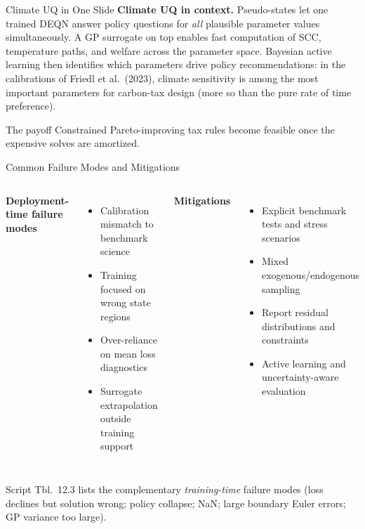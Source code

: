 \documentclass[aspectratio=169,11pt]{beamer}
\begin{document}
\begin{frame}{Climate UQ in One Slide}
\textbf{Climate UQ in context.}  Pseudo-states let one trained DEQN answer policy questions for \emph{all} plausible parameter values simultaneously.  A GP surrogate on top enables fast computation of SCC, temperature paths, and welfare across the parameter space.  Bayesian active learning then identifies which parameters drive policy recommendations: in the calibrations of Friedl et al.\ (2023), climate sensitivity is among the most important parameters for carbon-tax design (more so than the pure rate of time preference).

\vspace{0.25cm}
\begin{exampleblock}{The payoff}
Constrained Pareto-improving tax rules become feasible once the expensive solves are amortized.
\end{exampleblock}
\end{frame}

\begin{frame}{Common Failure Modes and Mitigations}
\small
\begin{columns}[T]
\textbf{Deployment-time failure modes}
\begin{itemize}
    \item Calibration mismatch to benchmark science
    \item Training focused on wrong state regions
    \item Over-reliance on mean loss diagnostics
    \item Surrogate extrapolation outside training support
\end{itemize}

\textbf{Mitigations}
\begin{itemize}
    \item Explicit benchmark tests and stress scenarios
    \item Mixed exogenous/endogenous sampling
    \item Report residual distributions and constraints
    \item Active learning and uncertainty-aware evaluation
\end{itemize}
\end{columns}

\vspace{0.15cm}
\footnotesize
Script Tbl.~12.3 lists the complementary \emph{training-time} failure modes (loss declines but solution wrong; policy collapse; NaN; large boundary Euler errors; GP variance too large).
\end{frame}
\end{document}
